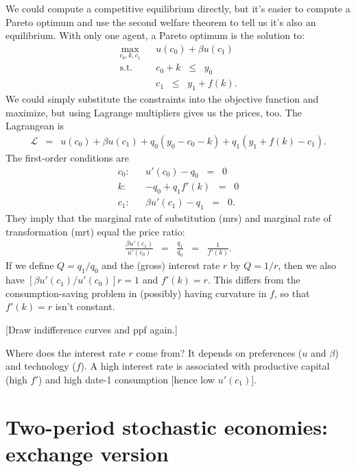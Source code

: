 \documentclass[11pt]{article}
\begin{document}
We could compute a competitive equilibrium directly,
but it's easier to compute a Pareto optimum and
use the second welfare theorem to tell us it's also
an equilibrium.
With only one agent, a Pareto optimum is the solution to:
\begin{eqnarray*}
    \max_{c_0,k,c_1} && u(c_0) + \beta u(c_1) \\
    \mbox{s.t.}   &&  c_0 + k \;\;\leq\;\; y_0 \\
                  &&  c_1 \;\;\leq\;\;  y_1 + f(k) .
\end{eqnarray*}
We could simply substitute the constraints into the objective
function and maximize, but using Lagrange multipliers gives us
the prices, too.
The Lagrangean is
\begin{eqnarray*}
    \mathcal{L} &=&  u(c_0) + \beta u(c_1) + q_0 (y_0 - c_0 - k)
                    + q_1 ( y_1 + f(k) - c_1)  .
\end{eqnarray*}
The first-order conditions are
\begin{eqnarray*}
    c_0: &&  u'(c_0) - q_0 \;\;=\;\; 0 \\
    k: &&  - q_0 + q_1 f'(k)  \;\;=\;\; 0 \\
    c_1: &&  \beta u'(c_1) - q_1 \;\;=\;\; 0 .
\end{eqnarray*}
They imply that the marginal rate of substitution (mrs)
and marginal rate of transformation (mrt)
equal the price ratio:
\begin{eqnarray*}
    \frac{\beta u'(c_1)}{u'(c_0)} &=& \frac{q_1}{q_0} \;\;=\;\; \frac{1}{f'(k)} .
\end{eqnarray*}
If we define $Q = q_1/q_0$ and the (gross) interest rate $r$ by $Q = 1/r$,
then we also have $ [\beta u'(c_1)/u'(c_0)] r = 1$ and $f'(k) = r$.
This differs from the consumption-saving problem in (possibly) having curvature
in $f$, so that $f'(k) = r$ isn't constant.

[Draw indifference curves and ppf again.]

Where does the interest rate $r$ come from?
It depends on preferences ($u$ and $\beta$) and technology ($f$).
A high interest rate is associated with productive capital (high $f'$)
and high date-1 consumption [hence low $u'(c_1)$].


\section{Two-period stochastic economies:  exchange version}
\end{document}
